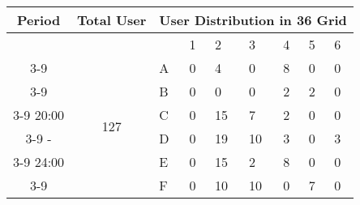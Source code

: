 \begin{table*}[hpt]
\begin{minipage}{.5\linewidth}
\begin{tabular}{|c|c|p{0.4cm}|p{0.4cm}|p{0.4cm}|p{0.4cm}|p{0.4cm}|p{0.4cm}|p{0.4cm}|}
\hline	
\end{tabular}	
\vspace*{0.1in} \\	
\begin{tabular}{|c|c|p{0.4cm}|p{0.4cm}|p{0.4cm}|p{0.4cm}|p{0.4cm}|p{0.4cm}|p{0.4cm}|}	
\hline	
Period & Total User &\multicolumn{7}{c|}{User Distribution in 36 Grid} \\	
\hline	
&& & 1 &2 & 3 & 4 & 5&6\\	
\cline{3-9}	
 & \multirow{7}{*}{127}	
 &A	
& 0& 4& 0& 8& 0& 0  \\	
\cline{3-9}	
 && B	
& 0& 0& 0& 2& 2& 0  \\	
\cline{3-9}	
20:00 && C	
& 0& 15& 7& 2& 0& 0  \\	
\cline{3-9}	
 -&& D 	
& 0& 19& 10& 3& 0& 3  \\	
\cline{3-9}	
24:00 && E 	
& 0& 15& 2& 8& 0& 0  \\	
\cline{3-9}	
 && F 	
& 0& 10& 10& 0& 7& 0  \\	
\hline	
\end{tabular}	
\vspace*{0.1in} \\	
\end{minipage}	
\label{table:houston_cluster}	
\caption{User Distribution in Districts of Houston}	
\end{table*}	
